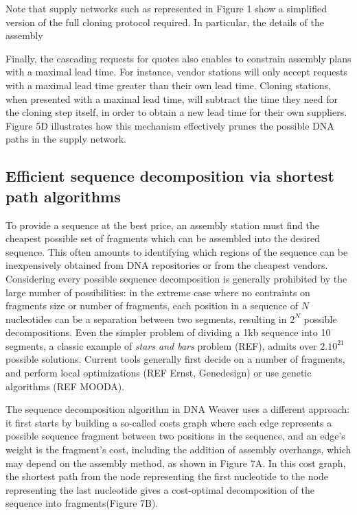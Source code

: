 Note that supply networks such as represented in Figure 1 show a simplified version of the full cloning protocol required. In particular, the details of the assembly

Finally, the cascading requests for quotes also enables to constrain assembly plans with a maximal lead time. For instance, vendor stations will only accept requests with a maximal lead time greater than their own lead time. Cloning stations, when presented with a maximal lead time, will subtract the time they need for the cloning step itself, in order to obtain a new lead time for their own suppliers. Figure 5D illustrates how this mechanism effectively prunes the possible DNA paths in the supply network.  




\subsection{Efficient sequence decomposition via shortest path algorithms}

To provide a sequence at the best price, an assembly station must find the cheapest possible set of fragments which can be assembled into the desired sequence. This often amounts to identifying which regions of the sequence can be inexpensively obtained from DNA repositories or from the cheapest
vendors. Considering every possible sequence decomposition is generally prohibited by the large number of possibilities: in the extreme case where no contraints on fragments size or number of fragments, each position in a sequence of $N$ nucleotides can be a separation between two segments, resulting in $2^N$ possible decompositions. Even the simpler problem of dividing a 1kb sequence into 10 segments, a classic example of \textit{stars and bars} problem (REF), admits over $2.10^{21}$ possible solutions. Current tools generally first decide on a number of fragments, and perform local optimizations (REF Ernst, Genedesign) or use genetic algorithms (REF MOODA).

The sequence decomposition algorithm in DNA Weaver uses a different approach: it first starts by building a so-called costs graph where each edge represents a possible sequence fragment between two positions in the sequence, and an edge’s weight is the fragment’s cost, including the addition of assembly overhangs, which may depend on the assembly method, as shown in Figure 7A. In this cost graph, the shortest path from the node representing the first nucleotide to the node representing the last nucleotide gives a cost-optimal decomposition of the sequence into fragments(Figure 7B).


